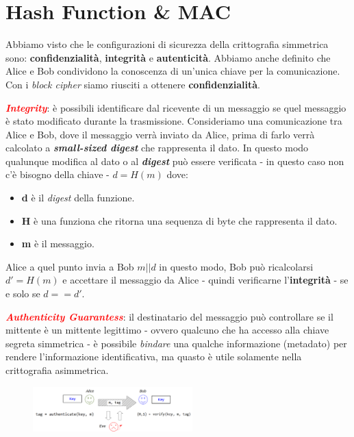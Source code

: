 \chapter{Hash Function \& MAC}

\begin{flushleft}
    Abbiamo visto che le configurazioni di sicurezza della crittografia simmetrica sono: \textbf{confidenzialità}, \textbf{integrità} e \textbf{autenticità}. Abbiamo anche definito che Alice e Bob condividono la conoscenza di un'unica chiave per la comunicazione. Con i \textit{block cipher} siamo riusciti a ottenere \textbf{confidenzialità}. 

    \medskip

    \textcolor{red}{\textbf{\textit{Integrity}}}: è possibili identificare dal ricevente di un messaggio se quel messaggio è stato modificato durante la trasmissione. Consideriamo una comunicazione tra Alice e Bob, dove il messaggio verrà inviato da Alice, prima di farlo verrà calcolato a \textbf{\textit{small-sized digest}} che rappresenta il dato. In questo modo qualunque modifica al dato o al \textbf{\textit{digest}} può essere verificata - in questo caso non c'è bisogno della chiave - $d = H(m)$ dove:
    \begin{itemize}[nosep]
        \item \textbf{d} è il \textit{digest} della funzione.
        \item \textbf{H} è una funziona che ritorna una sequenza di byte che rappresenta il dato.
        \item \textbf{m} è il messaggio.
    \end{itemize}
    Alice a quel punto invia a Bob $m || d$ in questo modo, Bob può ricalcolarsi $d' = H(m)$ e accettare il messaggio da Alice - quindi verificarne l'\textbf{integrità} - se e solo se $d == d'$.

    \medskip

    \textcolor{red}{\textbf{\textit{Authenticity Guarantess}}}: il destinatario del messaggio può controllare se il mittente è un mittente legittimo - ovvero qualcuno che ha accesso alla chiave segreta simmetrica - è possibile \textit{bindare} una qualche informazione (metadato) per rendere l'informazione identificativa, ma quasto è utile solamente nella crittografia asimmetrica.

    \begin{figure}[h]
        \centering
        \includegraphics[width=0.55\textwidth]{img/mac_tag.png}
    \end{figure}


\end{flushleft}
